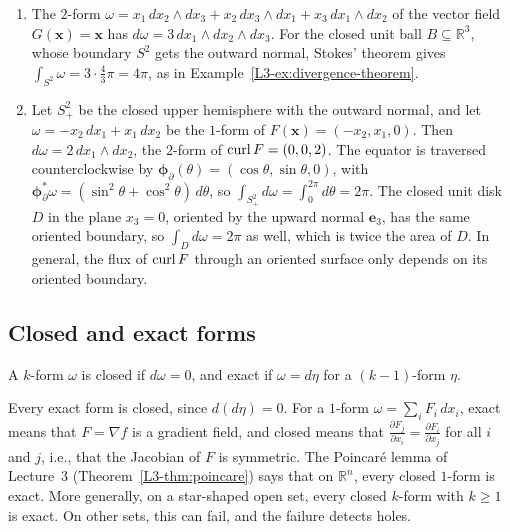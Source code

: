 \begin{example}\label{A-ex:stokes-manifolds}
    \begin{enumerate}
        \item The $2$-form $\omega = x_1\, dx_2 \wedge dx_3 + x_2\, dx_3 \wedge dx_1 + x_3\, dx_1 \wedge dx_2$ of the vector field $G(\mathbf{x}) = \mathbf{x}$ has $d\omega = 3\, dx_1 \wedge dx_2 \wedge dx_3$. For the closed unit ball $B \subseteq \mathbb{R}^3$, whose boundary $S^2$ gets the outward normal, Stokes' theorem gives $\int_{S^2} \omega = 3 \cdot \frac{4}{3}\pi = 4\pi$, as in Example~\ref{L3-ex:divergence-theorem}.
        \item Let $S^2_+$ be the closed upper hemisphere with the outward normal, and let $\omega = -x_2\, dx_1 + x_1\, dx_2$ be the $1$-form of $F(\mathbf{x}) = (-x_2, x_1, 0)$. Then $d\omega = 2\, dx_1 \wedge dx_2$, the $2$-form of $\operatorname{curl} F = (0, 0, 2)$. The equator is traversed counterclockwise by $\boldsymbol{\phi}_\partial(\theta) = (\cos\theta, \sin\theta, 0)$, with $\boldsymbol{\phi}_\partial^*\omega = (\sin^2\theta + \cos^2\theta)\, d\theta$, so $\int_{S^2_+} d\omega = \int_0^{2\pi} d\theta = 2\pi$. The closed unit disk $D$ in the plane $x_3 = 0$, oriented by the upward normal $\mathbf{e}_3$, has the same oriented boundary, so $\int_D d\omega = 2\pi$ as well, which is twice the area of $D$. In general, the flux of $\operatorname{curl} F$ through an oriented surface only depends on its oriented boundary.
    \end{enumerate}
\end{example}

\subsection{Closed and exact forms}

\begin{definition}\label{A-def:closed-exact}
    A $k$-form $\omega$ is closed if $d\omega = 0$, and exact if $\omega = d\eta$ for a $(k - 1)$-form $\eta$.
\end{definition}

Every exact form is closed, since $d(d\eta) = 0$. For a $1$-form $\omega = \sum_i F_i\, dx_i$, exact means that $F = \nabla f$ is a gradient field, and closed means that $\frac{\partial F_j}{\partial x_i} = \frac{\partial F_i}{\partial x_j}$ for all $i$ and $j$, i.e., that the Jacobian of $F$ is symmetric. The Poincar\'e lemma of Lecture~3 (Theorem~\ref{L3-thm:poincare}) says that on $\mathbb{R}^n$, every closed $1$-form is exact. More generally, on a star-shaped open set, every closed $k$-form with $k \geq 1$ is exact. On other sets, this can fail, and the failure detects holes.

